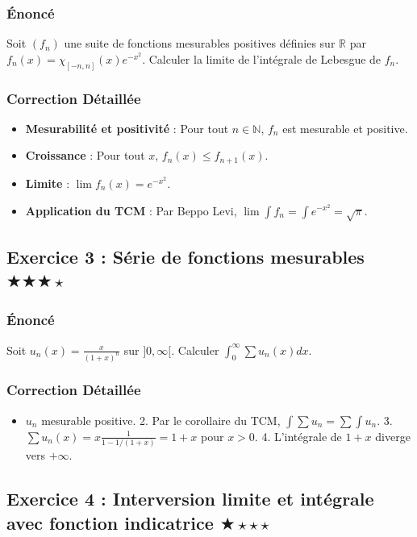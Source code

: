\documentclass[11pt,a4paper]{article}
\begin{document}
\subsubsection*{Énoncé}
Soit $(f_n)$ une suite de fonctions mesurables positives définies sur $\mathbb{R}$ par $f_n(x) = \chi_{[-n, n]}(x) e^{-x^2}$. Calculer la limite de l'intégrale de Lebesgue de $f_n$.

\subsubsection*{Correction Détaillée}
\begin{itemize}
\item \textbf{Mesurabilité et positivité} : Pour tout $n \in \mathbb{N}$, $f_n$ est mesurable et positive.
\item \textbf{Croissance} : Pour tout $x$, $f_n(x) \le f_{n+1}(x)$.
\item \textbf{Limite} : $\lim f_n(x) = e^{-x^2}$.
\item \textbf{Application du TCM} : Par Beppo Levi, $\lim \int f_n = \int e^{-x^2} = \sqrt{\pi}$.
\end{itemize}

\subsection*{Exercice 3 : Série de fonctions mesurables \quad $\bigstar\bigstar\bigstar\star$}

\subsubsection*{Énoncé}
Soit $u_n(x) = \frac{x}{(1+x)^n}$ sur $]0, \infty[$. Calculer $\int_0^\infty \sum u_n(x) dx$.

\subsubsection*{Correction Détaillée}
\begin{itemize}
\item $u_n$ mesurable positive. 2. Par le corollaire du TCM, $\int \sum u_n = \sum \int u_n$. 3. $\sum u_n(x) = x \frac{1}{1 - 1/(1+x)} = 1+x$ pour $x>0$. 4. L'intégrale de $1+x$ diverge vers $+\infty$.
\end{itemize}

\subsection*{Exercice 4 : Interversion limite et intégrale avec fonction indicatrice \quad $\bigstar\star\star\star$}
\end{document}

